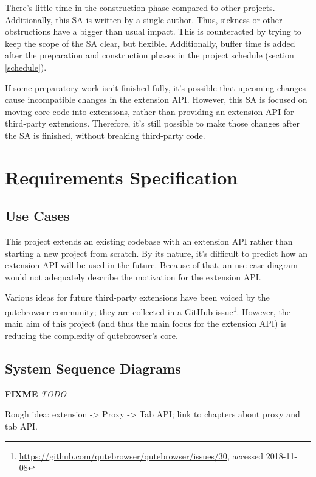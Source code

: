 \documentclass[a4paper,parskip=full]{scrreprt}
\newcommand{\fixme}[1]{\textbf{FIXME} \emph{#1}}
\begin{document}
There's little time in the construction phase compared to other projects.
Additionally, this SA is written by a single author. Thus, sickness or other
obstructions have a bigger than usual impact. This is counteracted by trying to
keep the scope of the SA clear, but flexible. Additionally, buffer time is
added after the preparation and construction phases in the project schedule
(section \ref{schedule}).

If some preparatory work isn't finished fully, it's possible that upcoming
changes cause incompatible changes in the extension API. However, this SA
is focused on moving core code into extensions, rather than providing an
extension API for third-party extensions. Therefore, it's still possible to make
those changes after the SA is finished, without breaking third-party code.


\chapter{Requirements Specification}

\section{Use Cases}

This project extends an existing codebase with an extension API rather
than starting a new project from scratch. By its nature, it's difficult to
predict how an extension API will be used in the future. Because of that, an
use-case diagram would not adequately describe the motivation for the extension
API.

Various ideas for future third-party extensions have been voiced by the
qutebrowser community; they are collected in a GitHub
issue\footnote{\url{https://github.com/qutebrowser/qutebrowser/issues/30},
  accessed 2018-11-08}. However, the main aim of this project (and thus the main
focus for the extension API) is reducing the complexity of qutebrowser's core.

\section{System Sequence Diagrams}
\fixme{TODO}

Rough idea: extension -> Proxy -> Tab API; link to chapters about proxy and tab API.

\end{document}
